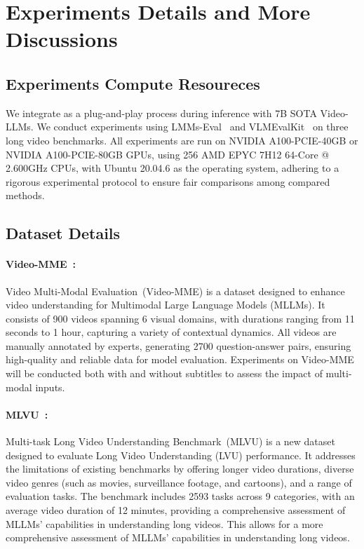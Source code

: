 \section{Experiments Details and More Discussions}

\subsection{Experiments Compute Resoureces}
We integrate \mname{} as a plug-and-play process during inference with 7B SOTA Video-LLMs.
We conduct experiments using LMMs-Eval~\cite{lmms_eval2024} and VLMEvalKit~\cite{duan2024vlmevalkit} on three long video benchmarks. 
All experiments are run on NVIDIA A100-PCIE-40GB or NVIDIA A100-PCIE-80GB GPUs, using 256 AMD EPYC 7H12 64-Core @ 2.600GHz CPUs, with Ubuntu 20.04.6 as the operating system, adhering to a rigorous experimental protocol to ensure fair comparisons among compared methods.

\subsection{Dataset Details}

\paragraph{Video-MME~\cite{fu2024video}:}  
Video Multi-Modal Evaluation~(Video-MME) is a dataset designed to enhance video understanding for Multimodal Large Language Models (MLLMs). It consists of 900 videos spanning 6 visual domains, with durations ranging from 11 seconds to 1 hour, capturing a variety of contextual dynamics.
All videos are manually annotated by experts, generating 2700 question-answer pairs, ensuring high-quality and reliable data for model evaluation.
Experiments on Video-MME will be conducted both with and without subtitles to assess the impact of multi-modal inputs.


\paragraph{MLVU~\cite{MLVU}:}
Multi-task Long Video Understanding Benchmark~(MLVU) is a new dataset designed to evaluate Long Video Understanding (LVU) performance.
It addresses the limitations of existing benchmarks by offering longer video durations, diverse video genres (such as movies, surveillance footage, and cartoons), and a range of evaluation tasks. 
The benchmark includes 2593 tasks across 9 categories, with an average video duration of 12 minutes, providing a comprehensive assessment of MLLMs' capabilities in understanding long videos.
This allows for a more comprehensive assessment of MLLMs' capabilities in understanding long videos.


